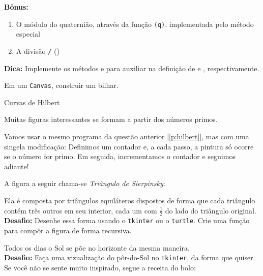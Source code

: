 \documentclass[12pt]{article}
\begin{document}
	\textbf{Bônus:}
	\begin{enumerate}
		\item O módulo do quaternião, através da função \texttt{(q)}, implementada pelo método especial 
		\item A divisão \texttt{\slash} ()
	\end{enumerate}

	\textbf{Dica:} Implemente os métodos  e  para auxiliar na definição de  e , respectivamente.
	
	
	

	\quest Em um \texttt{Canvas}, construir um bilhar.
	
	
	\label{p:hilbert}
	
	Curvas de Hilbert	
	
	
	Muitas figuras interessantes se formam a partir dos números primos.
	
	\quest Vamos usar o mesmo programa da questão anterior [\ref{p:hilbert}], mas com uma singela modificação: Definimos um contador e, a cada passo, a pintura só ocorre se o número for primo. Em seguida, incrementamos o contador e seguimos adiante!
	
	
	
		
	
	A figura a seguir chama-se \emph{Triângulo de Sierpinsky}:
	

	Ela é composta por triângulos equiláteros dispostos de forma que cada triângulo contém três outros em seu interior, cada um com $\frac{1}{2}$ do lado do triângulo original.\\
	
	\textbf{Desafio:} Desenhe essa forma usando o \texttt{tkinter} ou o \texttt{turtle}. Crie uma função para compôr a figura de forma recursiva.
	
	
	Todos os dias o Sol se põe no horizonte da mesma maneira.\\
	
	\textbf{Desafio:} Faça uma vizualização do pôr-do-Sol no \texttt{tkinter}, da forma que quiser. Se você não se sente muito inspirado, segue a receita do bolo:
	
\end{document}
